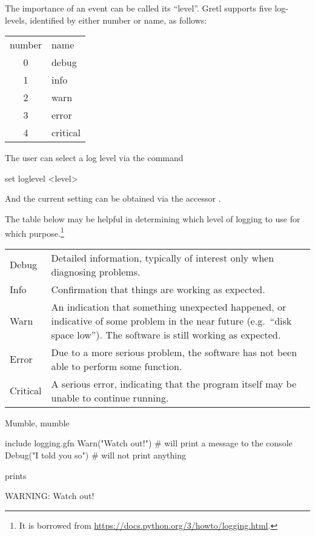 \documentclass{article}
\begin{document}
The importance of an event can be called its ``level''. Gretl
supports five log-levels, identified by either number or name, as follows:

\begin{center}
  \begin{tabular}{cl}
    number & name \\[4pt]
    0 & debug \\
    1 & info \\
    2 & warn \\
    3 & error \\
    4 & critical
  \end{tabular}
\end{center}

The user can select a log level via the command
\begin{code}
set loglevel <level>
\end{code}
And the current setting can be obtained via the accessor
.

The table below may be helpful in determining which level of logging
to use for which purpose.\footnote{It is borrowed from
  \url{https://docs.python.org/3/howto/logging.html}.}

\begin{center}
  \begin{tabular}{lp{}}
    Debug & Detailed information, typically of interest only when diagnosing
            problems.\\
    Info & Confirmation that things are working as expected.\\
    Warn & An indication that something unexpected happened, or indicative of some
           problem in the near future (e.g.\ ``disk space low''). The software is still working
           as expected.\\
    Error & Due to a more serious problem, the software has not been able to perform
            some function.\\
    Critical & A serious error, indicating that the program itself may be unable to
               continue running.
  \end{tabular}
\end{center}

Mumble, mumble
\begin{code}
include logging.gfn
Warn("Watch out!")      # will print a message to the console
Debug("I told you so")  # will not print anything
\end{code}
prints
\begin{code}
WARNING: Watch out!
\end{code}
\end{document}

